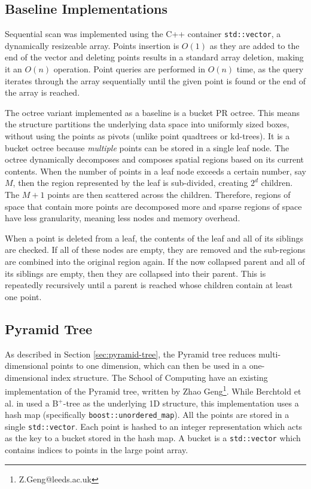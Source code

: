 \subsection{Baseline Implementations}
 
Sequential scan was implemented using the C++ container \texttt{std::vector}, a dynamically resizeable array. Points insertion is $O(1)$ as they are added to the end of the vector and deleting points results in a standard array deletion, making it an $O(n)$ operation. Point queries are performed in $O(n)$ time, as the query iterates through the array sequentially until the given point is found or the end of the array is reached.

The octree variant implemented as a baseline is a bucket PR octree. This means the structure partitions the underlying data space into uniformly sized boxes, without using the points as pivots (unlike point quadtrees or kd-trees). It is a bucket octree because \textit{multiple} points can be stored in a single leaf node. The octree dynamically decomposes and composes spatial regions based on its current contents. When the number of points in a leaf node exceeds a certain number, say $M$, then the region represented by the leaf is sub-divided, creating $2^d$ children. The $M + 1$ points are then scattered across the children. Therefore, regions of space that contain more points are decomposed more and sparse regions of space have less granularity, meaning less nodes and memory overhead.

When a point is deleted from a leaf, the contents of the leaf and all of its siblings are checked. If all of these nodes are empty, they are removed and the sub-regions are combined into the original region again. If the now collapsed parent and all of its siblings are empty, then they are collapsed into their parent. This is repeatedly recursively until a parent is reached whose children contain at least one point.

\subsection{Pyramid Tree}

As described in Section \ref{sec:pyramid-tree}, the Pyramid tree reduces multi-dimensional points to one dimension, which can then be used in a one-dimensional index structure. The School of Computing have an existing implementation of the Pyramid tree, written by Zhao Geng\footnote{Z.Geng@leeds.ac.uk}. While Berchtold et al. in \cite{pyramid-tree} used a B${}^{+}$-tree as the underlying 1D structure, this implementation uses a hash map (specifically \texttt{boost::unordered\_map}). All the points are stored in a single \texttt{std::vector}. Each point is hashed to an integer representation which acts as the key to a bucket stored in the hash map. A bucket is
 a \texttt{std::vector} which contains indices to points in the large point array.
 
